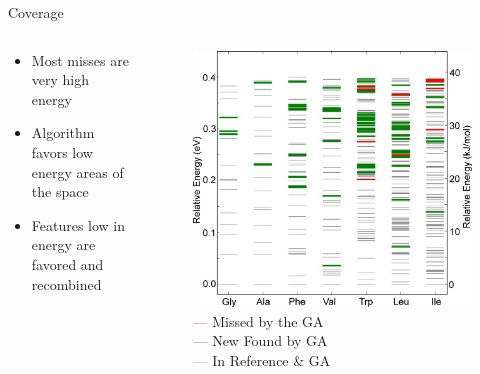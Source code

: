\documentclass[10pt]{beamer}
\begin{document}
{%
\begin{frame}{Coverage}
	\begin{columns}[c] %
		\begin{column}{.4\textwidth}
			\begin{itemize}[<+->]
				\item {Most misses are very high energy}
				\item {Algorithm favors low energy areas of the space}
				\item {Features low in energy are favored and recombined}
			\end{itemize}		
		\end{column}
		\hfill
		\begin{column}{0.6\textwidth}
			\begin{figure}
				\includegraphics[width=0.75\linewidth]{images/Supady5.jpeg}
				\caption*{\textcolor{red}{---} Missed by the GA \\
				  \textcolor{darkgreen}{---} New Found by GA \\
				  \textcolor{gray}{---} In Reference \& GA}
			\end{figure}
		\end{column}	
	\end{columns}
\end{frame}
}
\end{document}
